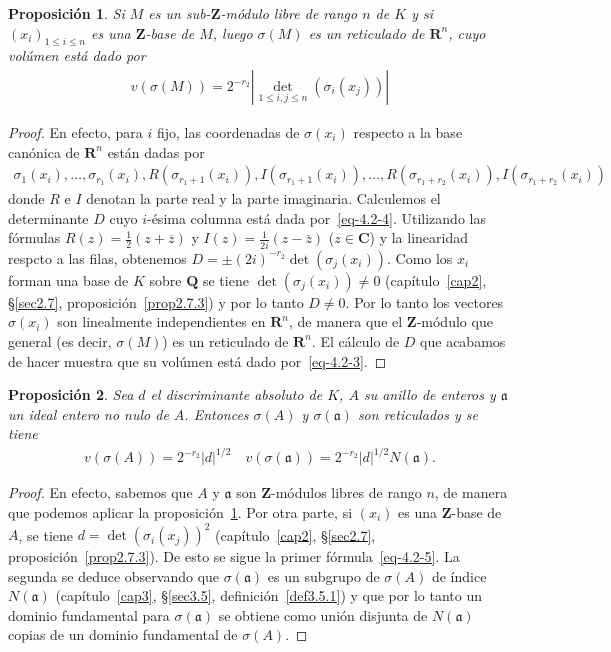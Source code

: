 \documentclass[10pt,oneside,bibtotoc,smallheadings,leqno,a5paper,DIV=12]{scrbook}
\newcommand{\RR}{\mathbf{R}}
\newcommand{\QQ}{\mathbf{Q}}
\newcommand{\ZZ}{\mathbf{Z}}
\newcommand{\CC}{\mathbf{C}}
\newcommand{\idl}[1]{\mathfrak{#1}}
\newcommand{\oline}[1]{\overline{#1}}
\newcommand{\abs}[1]{\left\lvert#1\right\rvert}
\numberwithin{equation}{section}
\theoremstyle{defi}
\theoremstyle{enonce}
\newtheorem{proposition}{Proposici\'on}
\theoremstyle{rem}
\numberwithin{theorem}{section}
\numberwithin{proposition}{section}
\numberwithin{definition}{section}
\numberwithin{lemma}{section}
\numberwithin{corollary}{section}
\numberwithin{example}{section}
\numberwithin{footnote}{section}%
\begin{document}
\begin{proposition}\label{prop4.2.1}
Si $M$ es un sub-$\ZZ$-m\'odulo libre de rango $n$ de $K$ y si $(x_{i})_{1\leq i\leq n}$ es una $\ZZ$-base
de $M$, luego $\sigma(M)$ es un reticulado de $\RR^{n}$, cuyo vol\'umen est\'a dado por
\begin{gather}\label{eq-4.2-3}
v(\sigma(M)) = 2^{-r_{2}}\abs{\det_{1\leq i,j\leq n}(\sigma_{i}(x_{j}))}
\end{gather}
\end{proposition}

\begin{proof}
En efecto, para $i$ fijo, las coordenadas de $\sigma(x_{i})$ respecto a la base can\'onica de $\RR^{n}$ est\'an
dadas por
\begin{gather}\label{eq-4.2-4}
\sigma_{1}(x_{i}),\dots,\sigma_{r_{1}}(x_{i}),R(\sigma_{r_{1}+1}(x_{i})),I(\sigma_{r_{1}+1}(x_{i})),\dots,
R(\sigma_{r_{1}+r_{2}}(x_{i})),I(\sigma_{r_{1}+r_{2}}(x_{i}))
\end{gather}
donde $R$ e $I$ denotan la parte real y la parte imaginaria. Calculemos el determinante $D$ cuyo $i$-\'esima
columna est\'a dada por~\eqref{eq-4.2-4}. Utilizando las f\'ormulas $R(z) = \frac{1}{2}(z+\oline z)$ y
$I(z) = \frac{1}{2i}(z-\oline z)$ ($z\in\CC$) y la linearidad respcto a las filas, obtenemos $D = \pm (2i)^{-r_{2}}
\det(\sigma_{j}(x_{i}))$. Como los $x_{i}$ forman una base de $K$ sobre $\QQ$ se tiene $\det(\sigma_{j}(x_{i}))\neq 0$
(cap\'itulo~\ref{cap2}, \S\ref{sec2.7}, proposici\'on~\ref{prop2.7.3})
y por lo tanto $D\neq 0$. Por lo tanto los vectores $\sigma(x_{i})$ son linealmente
independientes en $\RR^{n}$, de manera que el $\ZZ$-m\'odulo que general (es decir, $\sigma(M)$) es un
reticulado de $\RR^{n}$. El c\'alculo de $D$ que acabamos de hacer muestra que su vol\'umen est\'a dado
por~\eqref{eq-4.2-3}.
\end{proof}

\begin{proposition}\label{prop4.2.2}
Sea $d$ el discriminante absoluto de $K$, $A$ su anillo de enteros y $\idl{a}$ un ideal entero no nulo de $A$.
Entonces $\sigma(A)$ y $\sigma(\idl{a})$ son reticulados y se tiene
\begin{gather}\label{eq-4.2-5}
v(\sigma(A)) = 2^{-r_{2}}\abs{d}^{1/2}\quad v(\sigma(\idl{a})) = 2^{-r_{2}}\abs{d}^{1/2}N(\idl{a}).
\end{gather}
\end{proposition}

\begin{proof}
En efecto, sabemos que $A$ y $\idl{a}$ son $\ZZ$-m\'odulos libres de rango $n$, de manera que podemos aplicar
la proposici\'on~\ref{prop4.2.1}.
Por otra parte, si $(x_{i})$ es una $\ZZ$-base de $A$, se tiene
$d = \det(\sigma_{i}(x_{j}))^{2}$
(cap\'itulo~\ref{cap2}, \S\ref{sec2.7}, proposici\'on~\ref{prop2.7.3}).
De esto se sigue la primer f\'ormula~\eqref{eq-4.2-5}. La segunda se deduce observando que
$\sigma(\idl{a})$ es un subgrupo de $\sigma(A)$ de \'indice $N(\idl{a})$
(cap\'itulo~\ref{cap3}, \S\ref{sec3.5}, definici\'on~\ref{def3.5.1}) y que por
lo tanto un dominio fundamental para $\sigma(\idl{a})$ se obtiene como uni\'on disjunta de $N(\idl{a})$ copias
de un dominio fundamental de $\sigma(A)$.
\end{proof}
\end{document}
